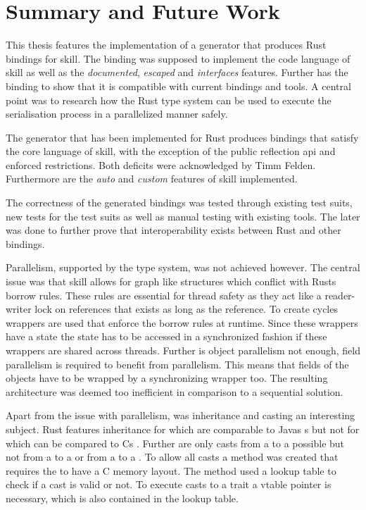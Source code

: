 \documentclass[thesis]{subfiles}
\begin{document}
\chapter{Summary and Future Work}
This thesis features the implementation of a generator that produces Rust bindings for \gls{skill}.
The binding was supposed to implement the code language of \gls{skill} as well as the \emph{documented}, \emph{escaped} and \emph{interfaces} features.
Further has the binding to show that it is compatible with current bindings and tools.
A central point was to research how the Rust type system can be used to execute the serialisation process in a parallelized manner safely.

The generator that has been implemented for Rust produces bindings that satisfy the core language of \gls{skill}, with the exception of the public reflection \gls{api} and  enforced restrictions.
Both deficits were acknowledged by Timm Felden.
Furthermore are the \emph{auto} and \emph{custom} features of \gls{skill} implemented.

The correctness of the generated bindings was tested through existing test suits, new tests for the test suits as well as manual testing with existing tools.
The later was done to further prove that interoperability exists between Rust and other bindings.

Parallelism, supported by the type system, was not achieved however.
The central issue was that \gls{skill} allows for graph like structures which conflict with Rusts borrow rules.
These rules are essential for thread safety as they act like a reader-writer lock on references that exists as long as the reference.
To create cycles wrappers are used that enforce the borrow rules at runtime.
Since these wrappers have a state the state has to be accessed in a synchronized fashion if these wrappers are shared across threads.
Further is object parallelism not enough, field parallelism is required to benefit from parallelism.
This means that fields of the objects have to be wrapped by a synchronizing wrapper too.
The resulting architecture was deemed too inefficient in comparison to a sequential solution.

Apart from the issue with parallelism, was inheritance and casting an interesting subject.
Rust features inheritance for \traits which are comparable to Javas s but not for \structs which can be compared to Cs \structs.
Further are only casts from a \struct to a \trait possible but not from a \trait to a \struct or from a \trait to a \trait.
To allow all casts a method was created that requires the \structs to have a C memory layout.
The method used a lookup table to check if a cast is valid or not.
To execute casts to a trait a vtable pointer is necessary, which is also contained in the lookup table.
\end{document}
